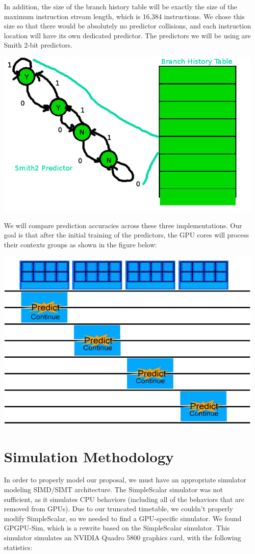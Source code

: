\documentclass[conference]{IEEEtran}
\begin{document}
In addition, the size of the branch history table will be exactly the size of the maximum instruction stream length, which is 16,384 instructions.  We chose this size so that there would be absolutely no predictor collisions, and each instruction location will have its own dedicated predictor.  The predictors we will be using are Smith 2-bit predictors.

\begin{center}
	\includegraphics[width=.45\textwidth]{bht.png}
\end{center}

We will compare prediction accuracies across these three implementations.  Our goal is that after the initial training of the predictors, the GPU cores will process their contexts groups as shown in the figure below:

\begin{center}
	\includegraphics[width=.45\textwidth]{GPU-predict-context.jpg}
\end{center}

\section{Simulation Methodology}

In order to properly model our proposal, we must have an appropriate simulator modeling SIMD/SIMT architecture.  The SimpleScalar simulator was not sufficient, as it simulates CPU behaviors (including all of the behaviors that are removed from GPUs).  Due to our truncated timetable, we couldn't properly modify SimpleScalar, so we needed to find a GPU-specific simulator.  We found GPGPU-Sim, which is a rewrite based on the SimpleScalar simulator.  This simulator simulates an NVIDIA Quadro 5800 graphics card, with the following statistics:
\end{document}
